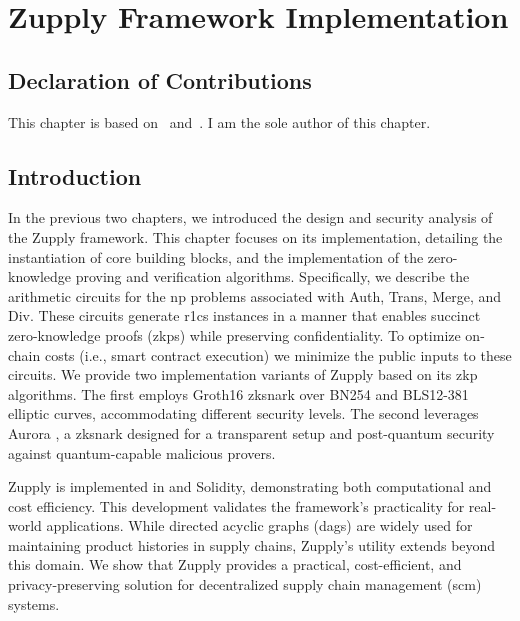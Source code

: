 \chapter{Zupply Framework Implementation}\label{ch:zupply_implementation}

\section*{Declaration of Contributions}
This chapter is based on~\cite{Badakhshan2024Zupply} and~\cite{Badakhshan2025AuroraZupply}. I am the sole author of this chapter.

\section{Introduction}

In the previous two chapters, we introduced the design and security analysis of the Zupply framework. This chapter focuses on its implementation, detailing the 
instantiation of core building blocks, and the implementation of the zero-knowledge proving and verification algorithms. Specifically, we describe the arithmetic circuits for the \gls{np} problems associated with \textsf{Auth}, \textsf{Trans}, \textsf{Merge}, and \textsf{Div}. These circuits generate \gls{r1cs} instances in a manner that enables succinct zero-knowledge proofs (\gls{zkp}s) while preserving confidentiality. To optimize on-chain costs (i.e., smart contract execution) we minimize the public inputs to these circuits. 
We provide two implementation variants of Zupply based on its \gls{zkp} algorithms. The first employs Groth16 \cite{Groth2016} \gls{zksnark} over BN254 \cite{BNcurve} and BLS12-381 \cite{BLS_curve2003} elliptic curves, accommodating different security levels. The second leverages Aurora \cite{Aurora2019}, a \gls{zksnark} designed for a transparent setup and post-quantum security against quantum-capable malicious provers.

Zupply is implemented in \CC and Solidity, demonstrating both computational and cost efficiency. This development validates the framework's practicality for real-world applications. While directed acyclic graphs (\gls{dag}s) are widely used for maintaining product histories in supply chains, Zupply's utility extends beyond this domain. We show that Zupply provides a practical, cost-efficient, and privacy-preserving solution for decentralized supply chain management (\gls{scm}) systems.

